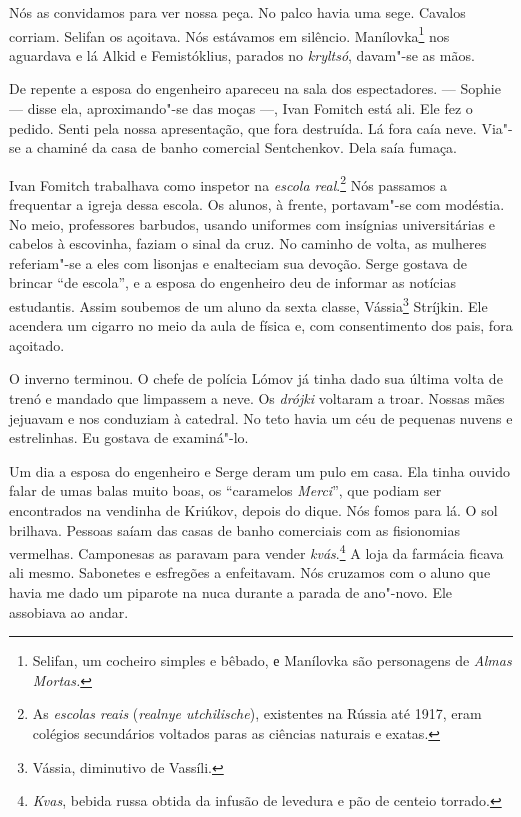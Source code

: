 Nós as convidamos para ver nossa peça. No palco havia uma sege. Cavalos
corriam. Selifan os açoitava. Nós estávamos em silêncio.
Manílovka\footnote{Selifan, um cocheiro simples e bêbado, е Manílovka
  são personagens de \emph{Almas Mortas. }} nos aguardava e lá Alkid e
Femistóklius, parados no \emph{kryltsó}, davam"-se as mãos.

De repente a esposa do engenheiro apareceu na sala dos espectadores. ---
Sophie --- disse ela, aproximando"-se das moças ---, Ivan Fomitch está
ali. Ele fez o pedido. Senti pela nossa apresentação, que fora
destruída. Lá fora caía neve. Via"-se a chaminé da casa de banho
comercial Sentchenkov. Dela saía fumaça.

Ivan Fomitch trabalhava como inspetor na \emph{escola real}.\footnote{As
  \emph{escolas reais} (\emph{realnye utchilische}), existentes na
  Rússia até 1917, eram colégios secundários voltados paras as ciências
  naturais e exatas.} Nós passamos a frequentar a igreja dessa escola.
Os alunos, à frente, portavam"-se com modéstia. No meio, professores
barbudos, usando uniformes com insígnias universitárias e cabelos à
escovinha, faziam o sinal da cruz. No caminho de volta, as mulheres
referiam"-se a eles com lisonjas e enalteciam sua devoção. Serge gostava
de brincar ``de escola'', e a esposa do engenheiro deu de informar as
notícias estudantis. Assim soubemos de um aluno da sexta classe,
Vássia\footnote{Vássia, diminutivo de Vassíli.} Stríjkin. Ele acendera
um cigarro no meio da aula de física e, com consentimento dos pais, fora
açoitado.

O inverno terminou. O chefe de polícia Lómov já tinha dado sua última
volta de trenó e mandado que limpassem a neve. Os \emph{drójki} voltaram
a troar. Nossas mães jejuavam e nos conduziam à catedral. No teto havia
um céu de pequenas nuvens e estrelinhas. Eu gostava de examiná"-lo.

Um dia a esposa do engenheiro e Serge deram um pulo em casa. Ela tinha
ouvido falar de umas balas muito boas, os ``caramelos \emph{Merci}'',
que podiam ser encontrados na vendinha de Kriúkov, depois do dique. Nós
fomos para lá. O sol brilhava. Pessoas saíam das casas de banho
comerciais com as fisionomias vermelhas. Camponesas as paravam para
vender \emph{kvás}.\footnote{\emph{Kvas}, bebida russa obtida da infusão
  de levedura e pão de centeio torrado.} A loja da farmácia ficava ali
mesmo. Sabonetes e esfregões a enfeitavam. Nós cruzamos com o aluno que
havia me dado um piparote na nuca durante a parada de ano"-novo. Ele
assobiava ao andar.

